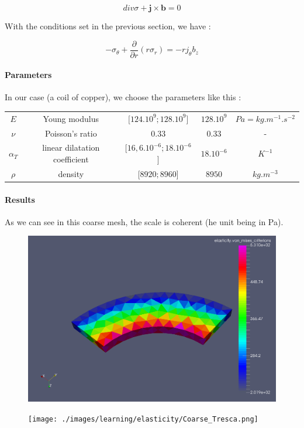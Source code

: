 \documentclass[11pt]{amsart}
\begin{document}
\[
div\sigma+\textbf{j}\times\textbf{b}=0
\]



With the conditions set in the previous section, we have :



\[
-\sigma_{\theta}+\frac{\partial}{\partial r}(r\sigma_{r})=-rj_{\theta}b_{z}
\]



\hypertarget{x-parameters}{\paragraph{Parameters}}
In our case (a coil of copper), we choose the parameters like this :


\begin{center}
\begin{tabular}{|c|c|c|c|c|}
\hline
$E$ & Young modulus & $[124.10^{9} ;128.10^{9}$] & $128.10^{9}$ & $Pa=kg.m^{-1} .s^{-2}$ \\ 
$\nu$ & Poisson’s ratio & 0.33 & 0.33 & - \\ 
$\alpha_{T}$ & linear dilatation coefficient & $[16,6.10^{-6} ;18.10^{-6}$] & $18.10^{-6}$ & $K^{-1}$ \\ 
$\rho$ & density & $[8920;8960$] & $8950$ & $kg.m^{-3}$ \\ 
\hline
\end{tabular}
\end{center}

\hypertarget{x-results}{\paragraph{Results}}
As we can see in this coarse mesh, the scale is coherent (he unit being in Pa).


\begin{figure}
\centering\includegraphics[width=4.75truein]{./images/learning/elasticity/Coarse_Von-Mises.png}


\end{figure}

\begin{figure}
\centering\texttt{[image: ./images/learning/elasticity/Coarse\_Tresca.png]}


\end{figure}
\end{document}
